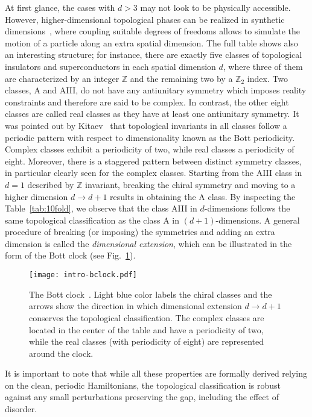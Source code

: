 At first glance, the cases with $d > 3$ may not look to be physically accessible. However, higher-dimensional topological phases can be realized in synthetic dimensions~\cite{Ozawa2019}, where coupling suitable degrees of freedoms allows to simulate the motion of a particle along an extra spatial dimension. The full table shows also an interesting structure; for instance, there are exactly five classes of topological insulators and superconductors in each spatial dimension $d$, where three of them are characterized by an integer $\mathbb{Z}$ and the remaining two by a $\mathbb{Z}_2$ index. Two classes, A and AIII, do not have any antiunitary symmetry which imposes reality constraints and therefore are said to be complex. In contrast, the other eight classes are called real classes as they have at least one antiunitary symmetry. It was pointed out by Kitaev~\cite{10foldKitaev2009} that topological invariants in all classes follow a periodic pattern with respect to dimensionality known as the Bott periodicity. Complex classes exhibit a periodicity of two, while real classes a periodicity of eight. Moreover, there is a staggered pattern between distinct symmetry classes, in particular clearly seen for the complex classes. Starting from the AIII class in $ d = 1$ described by $\mathbb{Z}$ invariant, breaking the chiral symmetry and moving to a higher dimension $d \rightarrow d+1$ results in obtaining the A class. By inspecting the Table~\ref{tab:10fold}, we observe that the class AIII in $d$-dimensions follows the same topological classification as the class A in $(d+1)$-dimensions. A general procedure of breaking (or imposing) the symmetries and adding an extra dimension is called the \emph{dimensional extension}, which can be illustrated in the form of the Bott clock (see Fig.~\ref{fig:bottclock}).

\begin{figure}
\centering
\texttt{[image: intro-bclock.pdf]}
\caption[The Bott clock]{The Bott clock~\cite{10foldKitaev2009}. Light blue color labels the chiral classes and the arrows show the direction in which dimensional extension $d \rightarrow d+1$ conserves the topological classification. The complex classes are located in the center of the table and have a periodicity of two, while the real classes (with periodicity of eight) are represented around the clock.}
\label{fig:bottclock}
\end{figure}

It is important to note that while all these properties are formally derived relying on the clean, periodic Hamiltonians, the topological classification is robust against any small perturbations preserving the gap, including the effect of disorder.

